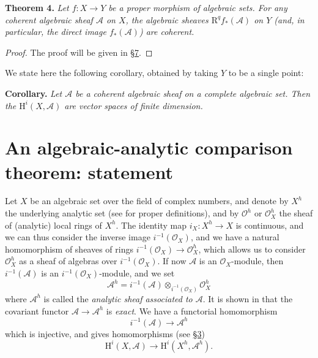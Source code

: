 \documentclass{article}
\newenvironment{itenv}[1]
  {\smallskip\noindent\textbf{#1.}\itshape}
  {\smallskip}
\newcommand{\scr}[1]{{\mathscr{#1}}}
\newcommand{\HH}{\mathrm{H}}
\newcommand{\RR}{\mathrm{R}}
\begin{document}
\begin{itenv}{Theorem 4}
\label{theorem4}
  Let $f\colon X\to Y$ be a proper morphism of algebraic sets.
  For any coherent algebraic sheaf $\scr{A}$ on $X$, the algebraic sheaves $\RR^qf_*(\scr{A})$ on $Y$ (and, in particular, the direct image $f_*(\scr{A})$) are coherent.
\end{itenv}

\begin{proof}
  The proof will be given in \hyperref[section7]{\S7}.
\end{proof}

We state here the following corollary, obtained by taking $Y$ to be a single point:

\begin{itenv}{Corollary}
  Let $\scr{A}$ be a coherent algebraic sheaf on a complete algebraic set.
  Then the $\HH^i(X,\scr{A})$ are vector spaces of finite dimension.
\end{itenv}


\section{An algebraic-analytic comparison theorem: statement}
\label{section6}

Let $X$ be an algebraic set over the field of complex numbers, and denote by $X^h$ the underlying analytic set (see \cite{2} for proper definitions), and by $\scr{O}^h$ or $\scr{O}_X^h$ the sheaf of (analytic) local rings of $X^h$.
The identity map $i_X\colon X^h\to X$ is continuous, and we can thus consider the inverse image $i^{-1}(\scr{O}_X)$, and we have a natural homomorphism of sheaves of rings $i^{-1}(\scr{O}_X)\to\scr{O}_X^h$, which allows us to consider $\scr{O}_X^h$ as a sheaf of algebras over $i^{-1}(\scr{O}_X)$.
If now $\scr{A}$ is an $\scr{O}_X$-module, then $i^{-1}(\scr{A})$ is an $i^{-1}(\scr{O}_X)$-module, and we set
\[
  \scr{A}^h = i^{-1}(\scr{A})\otimes_{i^{-1}(\scr{O}_X)}\scr{O}_X^h
\]
where $\scr{A}^h$ is called the \emph{analytic sheaf associated to $\scr{A}$}.
It is shown in \cite{2} that the covariant functor $\scr{A}\to\scr{A}^h$ is \emph{exact}.
We have a functorial homomorphism
\[
  i^{-1}(\scr{A}) \to \scr{A}^h
\]
which is injective, and gives homomorphisms (see \hyperref[section3]{\S3})
\[
\label{equation2}
  \HH^i(X,\scr{A}) \to \HH^i(X^h,\scr{A}^h).
  \tag{2}
\]
\end{document}
